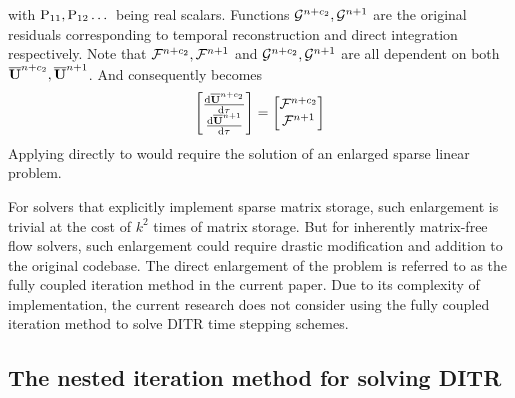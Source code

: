 \documentclass[preprint,12pt]{elsarticle}
\begin{document}
with $\mathrm{P}_{11},\mathrm{P}_{12} \dots$ being real scalars.
Functions $\mathcal{G}^{n+c_2},\mathcal{G}^{n+1}$ are the original residuals
corresponding to temporal reconstruction  and
direct integration  respectively. Note that
$\mathcal{F}^{n+c_2},\mathcal{F}^{n+1}$ and $\mathcal{G}^{n+c_2},\mathcal{G}^{n+1}$ are all
dependent on both $\overline{\mathbf{U}}^{n+c_2},\overline{\mathbf{U}}^{n+1}$.
And consequently  becomes
\begin{equation}
    \begin{bmatrix}
        \derivative{\uu^{n+c_2}}{\tau} \\
        \derivative{\uu^{n+1}}{\tau}
    \end{bmatrix} =
    \begin{bmatrix}
        \FF^{n+c_2} \\
        \FF^{n+1}
    \end{bmatrix}
    \label{eq:DITRNaiveDualTime}
\end{equation}
Applying  directly to 
would require the solution of an enlarged sparse linear problem.

For solvers that explicitly implement sparse matrix storage,
 such enlargement is trivial at the cost of $k^2$ times
of matrix storage. But for inherently matrix-free flow solvers,
such enlargement could require drastic modification and addition to
the original codebase.
The direct enlargement of the problem is referred to as
the fully coupled iteration method in the current paper.
Due to its complexity of implementation,
the current research does not consider using the 
fully coupled iteration method
to solve DITR time stepping schemes.




\subsection{The nested iteration method for solving DITR}
\end{document}
